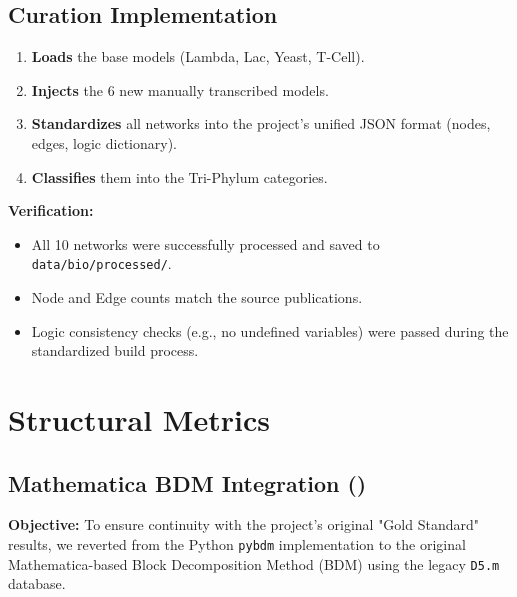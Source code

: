 \subsection{Curation Implementation}
\begin{enumerate}
    \item \textbf{Loads} the base models (Lambda, Lac, Yeast, T-Cell).
    \item \textbf{Injects} the 6 new manually transcribed models.
    \item \textbf{Standardizes} all networks into the project's unified JSON format (nodes, edges, logic dictionary).
    \item \textbf{Classifies} them into the Tri-Phylum categories.
\end{enumerate}

\textbf{Verification:}
\begin{itemize}
    \item All 10 networks were successfully processed and saved to \texttt{data/bio/processed/}.
    \item Node and Edge counts match the source publications.
    \item Logic consistency checks (e.g., no undefined variables) were passed during the standardized build process.
\end{itemize}

\section{Structural Metrics}

\subsection{Mathematica BDM Integration ()}
\textbf{Objective:} To ensure continuity with the project's original "Gold Standard" results, we reverted from the Python \texttt{pybdm} implementation to the original Mathematica-based Block Decomposition Method (BDM) using the legacy \texttt{D5.m} database.

